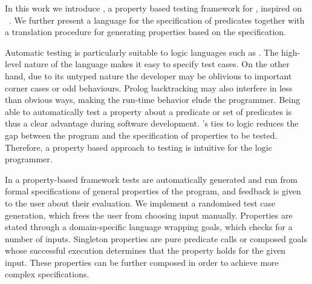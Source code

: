 In this work we introduce \plqc{}, a
property based testing framework for \Prolog{}, inspired on
 \QuickCheck~\cite{quickcheck}.
%
We further present a language for the specification of \Prolog{} predicates
together with a translation procedure for generating \plqc{} properties
based on the specification.


Automatic testing is particularly suitable to logic languages such as
\Prolog{}. The high-level nature of the language makes it easy to
specify test cases.
%
On the other hand, due to its untyped nature the developer may be
oblivious to important corner cases or odd behaviours.
%
Prolog backtracking may also interfere in less than obvious
ways, making the run-time behavior elude the programmer.
%
Being able to automatically test a property about a predicate or set of
predicates is thus a clear advantage during software development.
%
\Prolog{}'s ties to logic reduces the gap between the program and the
specification of properties to be tested.
%
Therefore, a property based approach to testing is intuitive for the
logic programmer.  


In a property-based framework tests are automatically generated and run from formal specifications of general
properties of the program, and feedback is given to the user about their
evaluation.
%
We implement a randomised test case generation, which frees the user
from choosing input manually.
%
Properties are stated through a domain-specific language wrapping
\Prolog{} goals, which \plqc{} checks for a number of inputs.
%
Singleton properties are pure predicate calls
or composed goals whose successful execution determines that the
property holds for the given input.
%
These properties can be further composed in order to achieve more complex
specifications.




